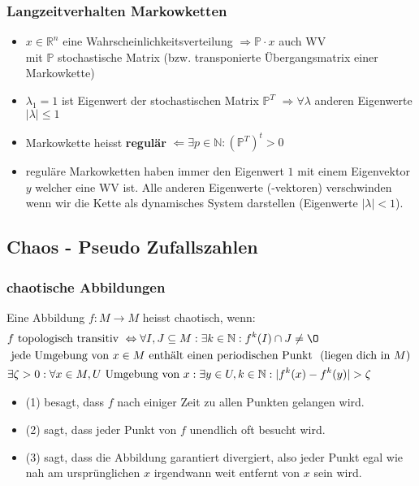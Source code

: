 \documentclass[a4paper]{article}
\newcommand{\R}{\mathbb{R}}
\begin{document}
\subsubsection{Langzeitverhalten Markowketten}
\begin{itemize}
	\item $x \in \R ^{n}$ eine Wahrscheinlichkeitsverteilung
		$\Rightarrow \mathbb{P} \cdot x$ auch WV \\
		mit $\mathbb{P}$ stochastische Matrix
		(bzw. transponierte Übergangsmatrix einer Markowkette)
	\item $\lambda_1 = 1$ ist Eigenwert der stochastischen Matrix
		$\mathbb{P} ^{T}$
		$\Rightarrow \forall \lambda$ anderen Eigenwerte
		$| \lambda | \leq 1$
	\item Markowkette heisst \textbf{regulär}
		$\Leftarrow \exists p \in \mathbb{N}: \left(
			\mathbb{P} ^{T}
		\right) ^{t} > 0$
	\item reguläre Markowketten haben immer den Eigenwert $1$
		mit einem Eigenvektor $y$ welcher eine WV ist.
		Alle anderen Eigenwerte (-vektoren) verschwinden
		wenn wir die Kette als dynamisches System darstellen
		(Eigenwerte $|\lambda|<1$).
\end{itemize}

\setcounter{equation}{0}

\subsection{Chaos - Pseudo Zufallszahlen}

\subsubsection{chaotische Abbildungen}
Eine Abbildung $f: M \rightarrow M$ heisst chaotisch, wenn:
\begin{align}
	& f \text{ topologisch transitiv }
	\Leftrightarrow \forall I, J \subseteq M: \exists k \in \mathbb{N}:
	f ^{k} (I) \cap J \ne \O
	\\
	& \text{ jede Umgebung von $x \in M$ enthält einen periodischen Punkt } 
	\text{ (liegen dich in $M$) }
	\\
	& \exists \zeta > 0: \forall x \in M
	, U \text{ Umgebung von } x:
	\exists y \in U, k \in \mathbb{N}:
	|f ^{k} (x) - f ^{k} (y) | > \zeta
\end{align}

\begin{itemize}
	\item (1) besagt, dass $f$ nach einiger Zeit zu allen Punkten
		gelangen wird.
	\item (2) sagt, dass jeder Punkt von $f$ unendlich oft besucht wird.
	\item (3) sagt, dass die Abbildung garantiert divergiert,
		also jeder Punkt egal wie nah am ursprünglichen $x$ irgendwann
		weit entfernt von $x$ sein wird.
\end{itemize}
\end{document}
